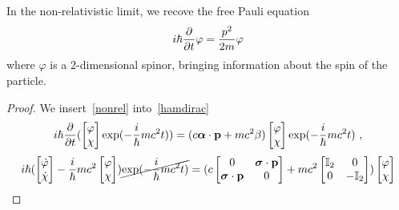     In the non-relativistic limit, we recove the free Pauli equation 
    \begin{equation*}
        i \hbar \frac{\partial}{\partial t} \varphi = \frac{p^2}{2m} \varphi
    \end{equation*}
    where $\varphi$ is a $2$-dimensional spinor, bringing information about the spin of the particle.
    \begin{proof}
        We insert~\eqref{nonrel} into~\eqref{hamdirac}
        \begin{equation*}
            i \hbar \frac{\partial}{\partial t} (\begin{bmatrix}
                \varphi \\ \chi \\
            \end{bmatrix} \exp(- \frac{i}{\hbar} m c^2 t)) = (c \boldsymbol \alpha \cdot \mathbf p + m c^2 \beta) \begin{bmatrix}
                \varphi \\ \chi \\
            \end{bmatrix} \exp(- \frac{i}{\hbar} m c^2 t) ~,
        \end{equation*}
        \begin{equation*}
            i \hbar (\begin{bmatrix}
                \dot \varphi \\ \dot \chi \\
            \end{bmatrix} - \frac{i}{\hbar} m c^2 \begin{bmatrix}
                \varphi \\ \chi \\
            \end{bmatrix} ) \cancel{\exp(- \frac{i}{\hbar} m c^2 t)} = (c \begin{bmatrix}
                0 & \boldsymbol \sigma \cdot \mathbf p \\
                \boldsymbol \sigma \cdot \mathbf p & 0 \\
            \end{bmatrix} + m c^2 \begin{bmatrix}
                \mathbb I_2 & 0 \\ 0 & -\mathbb I_2 \\
            \end{bmatrix}) \begin{bmatrix}
                \varphi \\ \chi \\

\end{bmatrix}
\end{equation*}
\end{proof}
